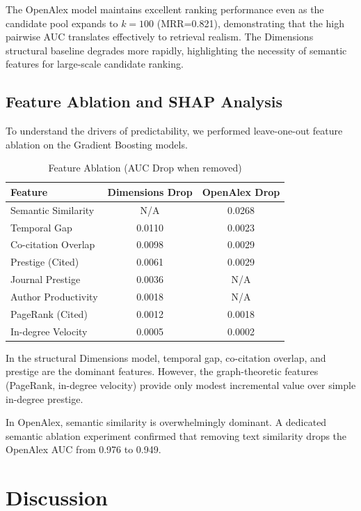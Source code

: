 \documentclass[11pt,a4paper]{article}
\begin{document}
The OpenAlex model maintains excellent ranking performance even as the candidate pool expands to $k=100$ (MRR=0.821), demonstrating that the high pairwise AUC translates effectively to retrieval realism. The Dimensions structural baseline degrades more rapidly, highlighting the necessity of semantic features for large-scale candidate ranking.

\subsection{Feature Ablation and SHAP Analysis}
To understand the drivers of predictability, we performed leave-one-out feature ablation on the Gradient Boosting models.

\begin{table}[H]
\centering
\caption{Feature Ablation (AUC Drop when removed)}
\label{tab:ablation}
\begin{tabular}{lcc}
\toprule
\textbf{Feature} & \textbf{Dimensions Drop} & \textbf{OpenAlex Drop} \\
\midrule
Semantic Similarity & N/A & 0.0268 \\
Temporal Gap & 0.0110 & 0.0023 \\
Co-citation Overlap & 0.0098 & 0.0029 \\
Prestige (Cited) & 0.0061 & 0.0029 \\
Journal Prestige & 0.0036 & N/A \\
Author Productivity & 0.0018 & N/A \\
PageRank (Cited) & 0.0012 & 0.0018 \\
In-degree Velocity & 0.0005 & 0.0002 \\
\bottomrule
\end{tabular}
\end{table}

In the structural Dimensions model, temporal gap, co-citation overlap, and prestige are the dominant features. However, the graph-theoretic features (PageRank, in-degree velocity) provide only modest incremental value over simple in-degree prestige. 

In OpenAlex, semantic similarity is overwhelmingly dominant. A dedicated semantic ablation experiment confirmed that removing text similarity drops the OpenAlex AUC from 0.976 to 0.949.

\section{Discussion}
\label{sec:discussion}
\end{document}
